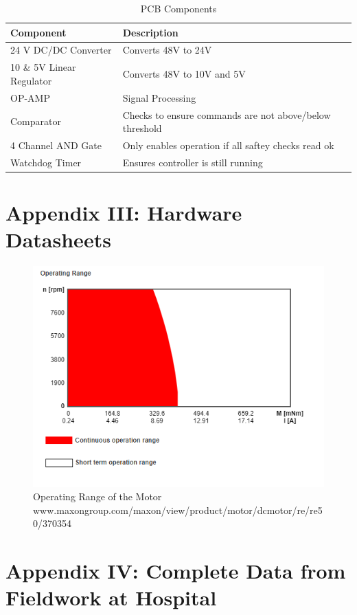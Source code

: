 \documentclass[12pt]{report}
\begin{document}
	\begin{table}[]
	\centering
	\caption{PCB Components}	
	\begin{tabular}{|l|l|}
		\hline
		\textbf{Component} & \textbf{Description}  \\ \hline
		24 V DC/DC Converter & Converts 48V to 24V  \\ \hline
		10 \& 5V Linear Regulator & Converts 48V to 10V and 5V  \\ \hline
		OP-AMP & Signal Processing   \\ \hline
		Comparator & Checks to ensure commands are not above/below threshold   \\ \hline
		4 Channel AND Gate & Only enables operation if all saftey checks read ok   \\ \hline
		Watchdog Timer & Ensures controller is still running \\ \hline

		\end{tabular}
	\label{tab:belt}
	\end{table}

\chapter*{Appendix III: Hardware Datasheets}

	\begin{figure}[h] 
		\centering
		\includegraphics[width=0.75\linewidth]{Motor_range}
		\caption{Operating Range of the Motor \newline \small www.maxongroup.com/maxon/view/product/motor/dcmotor/re/re50/370354}
		\label{fig:motor_range}
	\end{figure}

\chapter*{Appendix IV: Complete Data from Fieldwork at Hospital}


	
	


\end{document}
